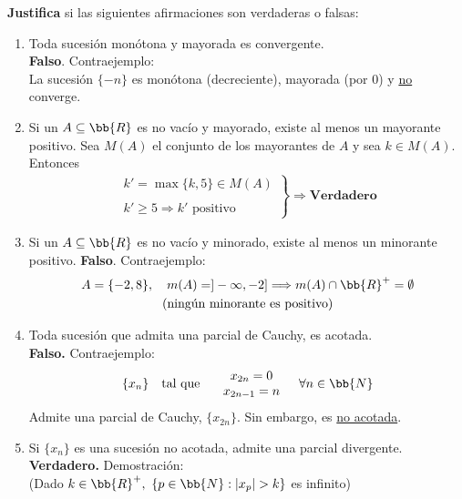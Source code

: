 \documentclass[12pt]{article}
\begin{document}
    \begin{ejercicio}[2 puntos]
        \textbf{Justifica} si las siguientes afirmaciones son verdaderas o falsas:
        \begin{enumerate}
            \item Toda sucesión monótona y mayorada es convergente.\\
            \textbf{Falso}. Contraejemplo:\\
            La sucesión $\{-n\}$ es monótona (decreciente), mayorada (por $0$) y \underline{no} converge.
            \item Si un $A \subseteq \bb{R}$ es no vacío y mayorado, existe al menos un mayorante positivo.
            Sea $M(A)$ el conjunto de los mayorantes de $A$ y sea $k\in M(A)$. Entonces
            \begin{gather*}
                \left.
                \begin{array}{l}
                     k'=\max\{k,5\}\in M(A)\\\\
                     k'\geq 5 \Rightarrow k' \text{ positivo}
                \end{array}
                \right\} \Longrightarrow \textbf{Verdadero}
            \end{gather*}
            \item Si un $A \subseteq \bb{R}$ es no vacío y minorado, existe al menos un minorante positivo.
            \textbf{Falso}. Contraejemplo:
            \begin{gather*}
                A=\{-2,8\},\ \ \ m(A)=]-\infty , -2] \Longrightarrow m(A) \cap \bb{R}^+ = \emptyset\\
                \text{(ningún minorante es positivo)}
            \end{gather*}
            \item Toda sucesión que admita una parcial de Cauchy, es acotada.\\
            \textbf{Falso.} Contraejemplo:
            \begin{gather*}
                \begin{array}{ccc}
                    \{x_n\} \ \ \text{ tal que }&
                    \begin{array}{c}
                         x_{2n}=0\\
                         x_{2n-1}=n
                    \end{array}& \forall n \in \bb{N}\\
                \end{array}
            \end{gather*}
            Admite una parcial de Cauchy, $\{x_{2n}\}$. Sin embargo, es \underline{no acotada}.
            \item Si $\{x_n\}$ es una sucesión no acotada, admite una parcial divergente.\\
            \textbf{Verdadero.} Demostración:\\
            (Dado $k \in \bb{R}^+,\ \{p \in \bb{N} : |x_p|>k\}$ es infinito)\\


\end{enumerate}
\end{ejercicio}
\end{document}
